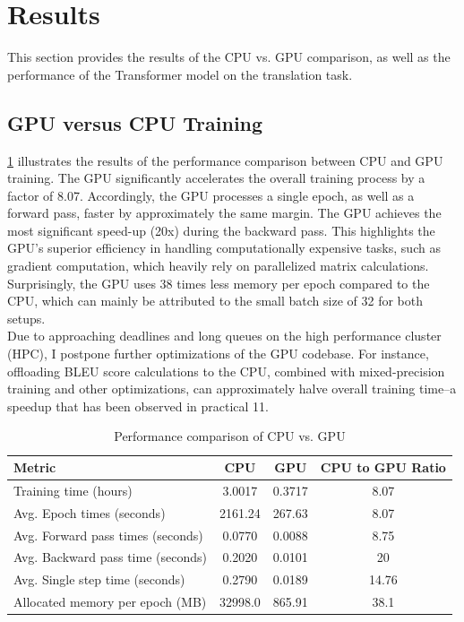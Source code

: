 \section{Results}\label{sec:results}

This section provides the results of the CPU vs. GPU comparison, as well as the performance of the Transformer model on the translation task.

\subsection{GPU versus CPU Training}

\cref{tab:comparison} illustrates the results of the performance comparison between CPU and GPU training.
The GPU significantly accelerates the overall training process by a factor of 8.07.
Accordingly, the GPU processes a single epoch, as well as a forward pass, faster by approximately the same margin.
The GPU achieves the most significant speed-up (20x) during the backward pass.
This highlights the GPU's superior efficiency in handling computationally expensive tasks, such as gradient computation, which heavily rely on parallelized matrix calculations.
Surprisingly, the GPU uses 38 times less memory per epoch compared to the CPU, which can mainly be attributed to the small batch size of 32 for both setups.\\
Due to approaching deadlines and long queues on the high performance cluster (HPC), I postpone further optimizations of the GPU codebase.
For instance, offloading BLEU score calculations to the CPU, combined with mixed-precision training and other optimizations, can approximately halve overall training time--a speedup that has been observed in practical 11.\\
\begin{table}[ht]
    \centering
    \begin{tabular}{lccc}
        \toprule
        \textbf{Metric} & \textbf{CPU} & \textbf{GPU} & \textbf{CPU to GPU Ratio} \\
        \midrule
        Training time (hours)       & 3.0017 & 0.3717 & 8.07 \\
        Avg. Epoch times (seconds)       & 2161.24 & 267.63 & 8.07 \\
        Avg. Forward pass times (seconds)& 0.0770 & 0.0088 & 8.75 \\
        Avg. Backward pass time (seconds)& 0.2020 & 0.0101 & 20 \\
        Avg. Single step time (seconds)  & 0.2790 & 0.0189 & 14.76  \\
        Allocated memory per epoch (MB)       & 32998.0  & 865.91 & 38.1 \\
        \bottomrule
    \end{tabular}
    \caption{Performance comparison of CPU vs. GPU}
    \label{tab:comparison}
\end{table}
